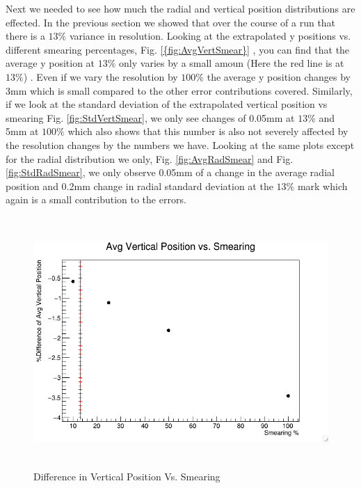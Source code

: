 \documentclass[./Thesis]{subfiles}
\begin{document}
		Next we needed to see how much the radial and vertical position distributions are effected. In the previous section we showed that over the course of a run that there is a $13\%$ variance in resolution. Looking at the extrapolated y positions vs. different smearing percentages, Fig. \ref{{fig:AvgVertSmear}} , you can find that the average y position at $13\%$ only varies by a small amoun (Here the red line is at $13\%$) .  Even if we vary the resolution by $100\%$ the average y position changes by 3mm which is small compared to the other error contributions covered. Similarly, if we look at the standard deviation of the extrapolated vertical position vs smearing  Fig. \ref{fig:StdVertSmear}, we only see changes of 0.05mm at $13\%$ and 5mm at $100\%$ which also shows that this number is also not severely affected by the resolution changes by the numbers we have. Looking at the same plots except for the radial distribution we only, Fig. \ref{fig:AvgRadSmear} and Fig. \ref{fig:StdRadSmear}, we only observe 0.05mm of a change in the average radial position and 0.2mm change in radial standard deviation at the $13\%$  mark which again is a small contribution to the errors. 
\begin{figure}
	\centerline{\includegraphics[height=95mm]{AvgVerticalSmear.png}}
	\caption[AvgVerticalSmear]{Difference in Vertical Position Vs. Smearing}
	\label{fig:AvgVertSmear}
\end{figure} 	
\end{document}
